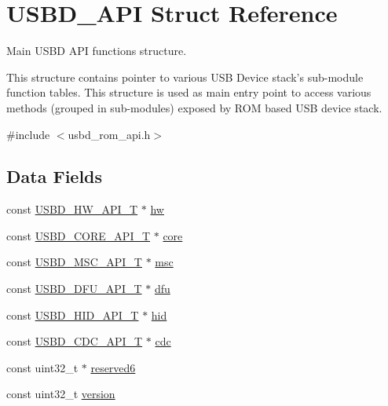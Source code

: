 \hypertarget{structUSBD__API}{\section{U\-S\-B\-D\-\_\-\-A\-P\-I Struct Reference}
\label{structUSBD__API}
}


Main U\-S\-B\-D A\-P\-I functions structure.

This structure contains pointer to various U\-S\-B Device stack's sub-\/module function tables. This structure is used as main entry point to access various methods (grouped in sub-\/modules) exposed by R\-O\-M based U\-S\-B device stack.  




{\ttfamily \#include $<$usbd\-\_\-rom\-\_\-api.\-h$>$}

\subsection*{Data Fields}
\begin{DoxyCompactItemize}
\item 
const \hyperlink{group__USBD__HW_ga4df5b7beaddc4e9267c320d92b4434fc}{U\-S\-B\-D\-\_\-\-H\-W\-\_\-\-A\-P\-I\-\_\-\-T} $\ast$ \hyperlink{structUSBD__API_a80f452bd8ff7fdff6fb835beb5e3255c}{hw}
\item 
const \hyperlink{group__USBD__Core_ga6a53e8395d1c68f98d18ca4a49b75baa}{U\-S\-B\-D\-\_\-\-C\-O\-R\-E\-\_\-\-A\-P\-I\-\_\-\-T} $\ast$ \hyperlink{structUSBD__API_a52b343de8166692bd2b4aecfb5eea59d}{core}
\item 
const \hyperlink{group__USBD__MSC_ga521bb0e0edf4060aeb10827c6c29f7cf}{U\-S\-B\-D\-\_\-\-M\-S\-C\-\_\-\-A\-P\-I\-\_\-\-T} $\ast$ \hyperlink{structUSBD__API_a0a7fefe527769345f3565fba289c8358}{msc}
\item 
const \hyperlink{group__USBD__DFU_gadf9281f8af1223053e3ccf48e26ac80d}{U\-S\-B\-D\-\_\-\-D\-F\-U\-\_\-\-A\-P\-I\-\_\-\-T} $\ast$ \hyperlink{structUSBD__API_ade2d145690a4684babfc683b9cdec47f}{dfu}
\item 
const \hyperlink{group__USBD__HID_ga48d7b7f66a852d99dfbe2c419cc408ba}{U\-S\-B\-D\-\_\-\-H\-I\-D\-\_\-\-A\-P\-I\-\_\-\-T} $\ast$ \hyperlink{structUSBD__API_add4c43d092004fe92e77152d970e877b}{hid}
\item 
const \hyperlink{group__USBD__CDC_gaad7f61aed01ad4130bee0f50b17eb716}{U\-S\-B\-D\-\_\-\-C\-D\-C\-\_\-\-A\-P\-I\-\_\-\-T} $\ast$ \hyperlink{structUSBD__API_a5560686e2f376096d2e1a640bb16bb84}{cdc}
\item 
const uint32\-\_\-t $\ast$ \hyperlink{structUSBD__API_a4761deeab24d9655d4ab471dee37fe9a}{reserved6}
\item 
const uint32\-\_\-t \hyperlink{structUSBD__API_a900209612d9df086dd044b630607955b}{version}
\end{DoxyCompactItemize}


